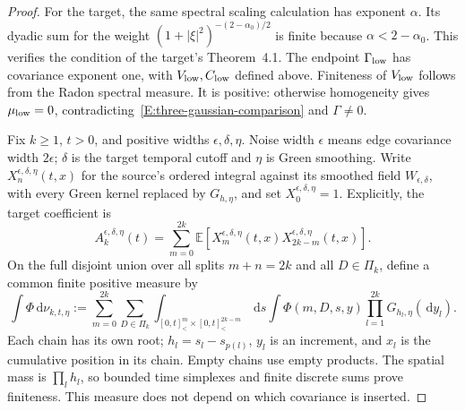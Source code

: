 \documentclass[12pt]{article}
\numberwithin{equation}{section}
\theoremstyle{definition}
\newcommand{\E}{\mathbb{E}}
\newcommand{\ud}{\,\mathrm{d}}
\begin{document}
\begin{proof}
  For the target, the same spectral scaling calculation has exponent
  $\alpha$. Its dyadic sum for the weight
  $(1+|\xi|^2)^{-(2-\alpha_0)/2}$ is finite because
  $\alpha<2-\alpha_0$. This verifies the condition of the target's
  Theorem~4.1. The endpoint $\Gamma_{\rm low}$ has covariance
  exponent one, with $V_{\rm low},C_{\rm low}$ defined above.
  Finiteness of $V_{\rm low}$ follows from the Radon spectral measure.
  It is positive: otherwise homogeneity gives $\mu_{\rm low}=0$,
  contradicting~\eqref{E:three-gaussian-comparison} and $\Gamma\ne0$.

  Fix $k\ge1$, $t>0$, and positive widths $\epsilon,\delta,\eta$.
  Noise width $\epsilon$ means edge covariance width $2\epsilon$;
  $\delta$ is the target temporal cutoff and $\eta$ is Green smoothing.
  Write $X_n^{\epsilon,\delta,\eta}(t,x)$ for the source's ordered
  integral against its smoothed field $W_{\epsilon,\delta}$, with
  every Green kernel replaced by $G_{h,\eta}$, and set
  $X_0^{\epsilon,\delta,\eta}=1$. Explicitly, the target coefficient is
  \[
    A_k^{\epsilon,\delta,\eta}(t)
    =\sum_{m=0}^{2k}
    \E\left[X_m^{\epsilon,\delta,\eta}(t,x)
    X_{2k-m}^{\epsilon,\delta,\eta}(t,x)\right].
  \]
  On the full disjoint union over all splits $m+n=2k$ and all
  $D\in\Pi_k$, define a common finite positive measure by
  \[
    \int\Phi\ud\nu_{k,t,\eta}
    :=\sum_{m=0}^{2k}\sum_{D\in\Pi_k}
    \int_{[0,t]^m_<\times[0,t]^{2k-m}_<}\ud s
    \int\Phi(m,D,s,y)\prod_{l=1}^{2k}G_{h_l,\eta}(\ud y_l).
  \]
  Each chain has its own root; $h_l=s_l-s_{p(l)}$, $y_l$ is an
  increment, and $x_l$ is the cumulative position in its chain.
  Empty chains use empty products. The spatial mass is $\prod_lh_l$,
  so bounded time simplexes and finite discrete sums prove finiteness.
  This measure does not depend on which covariance is inserted.


\end{proof}
\end{document}
